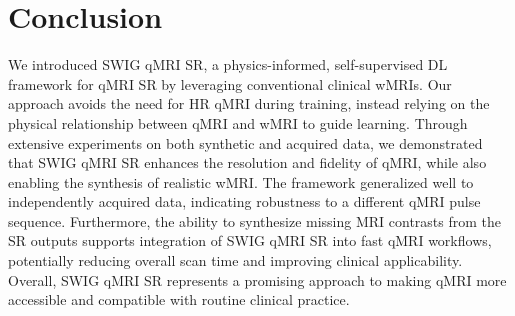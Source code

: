 \documentclass[journal,twoside,web]{ieeecolor}
\begin{document}
\section{Conclusion}

We introduced SWIG qMRI SR, a physics-informed, self-supervised DL framework for qMRI SR by leveraging conventional clinical wMRIs. Our approach avoids the need for HR qMRI during training, instead relying on the physical relationship between qMRI and wMRI to guide learning. Through extensive experiments on both synthetic and acquired data, we demonstrated that SWIG qMRI SR enhances the resolution and fidelity of qMRI, while also enabling the synthesis of realistic wMRI. The framework generalized well to independently acquired data, indicating robustness to a different qMRI pulse sequence. Furthermore, the ability to synthesize missing MRI contrasts from the SR outputs supports integration of SWIG qMRI SR into fast qMRI workflows, potentially reducing overall scan time and improving clinical applicability. Overall, SWIG qMRI SR represents a promising approach to making  qMRI more accessible and compatible with routine clinical practice.
\end{document}
